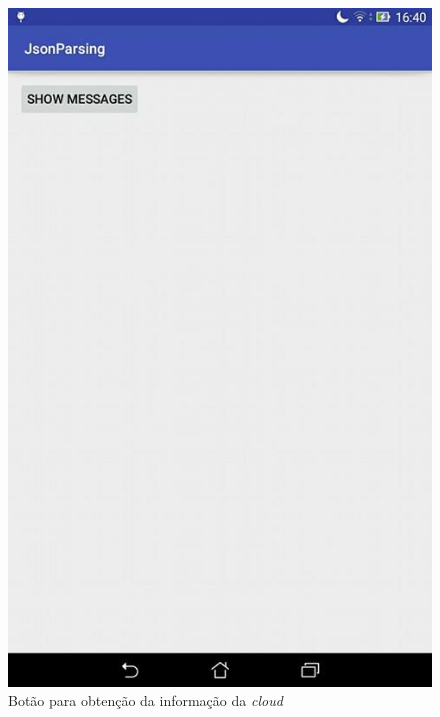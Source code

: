 \documentclass[a4paper]{article}
\begin{document}
\begin{figure}[H]
  \includegraphics[width=\linewidth]{get.jpg}
  \caption{Botão para obtenção da informação da \textit{cloud}}\label{fig:get}
\endminipage\hfill
{}

\end{figure}
\end{document}
